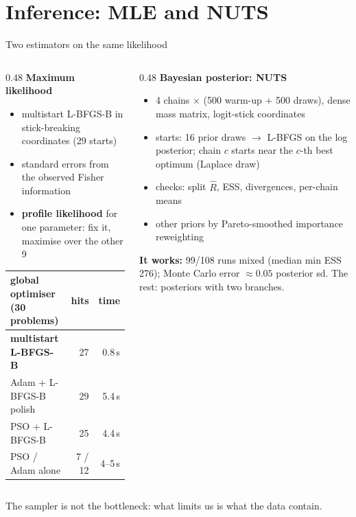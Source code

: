 \documentclass[aspectratio=169,11pt]{beamer}
\newcommand{\take}[1]{\begin{block}{}\small #1\end{block}}
\begin{document}
\section{Inference: MLE and NUTS}

\begin{frame}{Two estimators on the same likelihood}
\begin{columns}[T]
\begin{column}{0.48\textwidth}
\textbf{Maximum likelihood}
\begin{itemize}\small
\item multistart L-BFGS-B in stick-breaking coordinates (29 starts)
\item standard errors from the observed Fisher information
\item \textbf{profile likelihood} for one parameter: fix it, maximise over the other 9
\end{itemize}
\smallskip
{\scriptsize\begin{tabular}{@{}lrr@{}}\toprule
global optimiser (30 problems) & hits & time \\\midrule
\textbf{multistart L-BFGS-B} & 27 & 0.8\,s \\
Adam + L-BFGS-B polish & 29 & 5.4\,s \\
PSO + L-BFGS-B & 25 & 4.4\,s \\
PSO / Adam alone & 7 / 12 & 4--5\,s \\\bottomrule
\end{tabular}}
\end{column}
\begin{column}{0.48\textwidth}
\textbf{Bayesian posterior: NUTS}
\begin{itemize}\small
\item 4 chains $\times$ (500 warm-up + 500 draws), dense mass matrix, logit-stick coordinates
\item starts: 16 prior draws $\to$ L-BFGS on the log posterior; chain $c$ starts near the $c$-th best optimum (Laplace draw)
\item checks: split $\hat R$, ESS, divergences, per-chain means
\item other priors by Pareto-smoothed importance reweighting
\end{itemize}
\smallskip
{\small\textbf{It works:} 99/108 runs mixed (median min ESS 276); Monte Carlo error $\approx 0.05$ posterior sd. The rest: posteriors with two branches.}
\end{column}
\end{columns}
\take{The sampler is not the bottleneck: what limits us is what the data contain.}
\end{frame}
\end{document}
